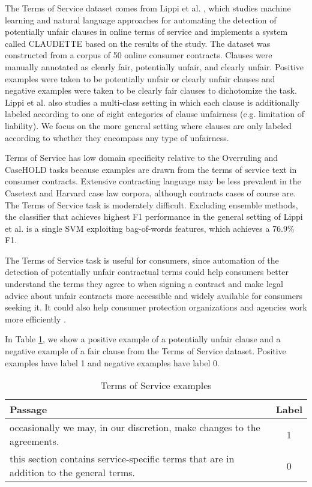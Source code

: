 \documentclass[sigconf]{acmart}
\begin{document}
The Terms of Service dataset comes from Lippi et al. \cite{Lippi_2019}, which studies machine learning and natural language approaches for automating the detection of potentially unfair clauses in online terms of service and implements a system called CLAUDETTE based on the results of the study. The dataset was constructed from a corpus of 50 online consumer contracts. Clauses were manually annotated as clearly fair, potentially unfair, and clearly unfair. Positive examples were taken to be potentially unfair or clearly unfair clauses and negative examples were taken to be clearly fair clauses to dichotomize the task. Lippi et al. \cite{Lippi_2019} also studies a multi-class setting in which each clause is additionally labeled according to one of eight categories of clause unfairness (e.g. limitation of liability). We focus on the more general setting where clauses are only labeled according to whether they encompass any type of unfairness.

Terms of Service has low domain specificity relative to the Overruling and CaseHOLD tasks because examples are drawn from the terms of service text in consumer contracts. Extensive contracting language may be less prevalent in the  Casetext and Harvard case law corpora, although contracts cases of course are. The Terms of Service task is moderately difficult. Excluding ensemble methods, the classifier that achieves highest F1 performance in the general setting of Lippi et al. \cite{Lippi_2019} is a single SVM exploiting bag-of-words features, which achieves a 76.9\% F1.

The Terms of Service task is useful for consumers, since automation of the detection of potentially unfair contractual terms could help consumers better understand the terms they agree to when signing a contract and make legal advice about unfair contracts more accessible and widely available for consumers seeking it. It could also help consumer protection organizations and agencies work more efficiently \cite{Lippi_2019}.

In Table \ref{tab:tos}, we show a positive example of a potentially unfair clause and a negative example of a fair clause from the Terms of Service dataset. Positive examples have label 1 and negative examples have label 0.

\begin{table}[htb]
    \centering
    \small
    \caption{Terms of Service examples}
    \vspace{-0.15in}
    \begin{tabularx}{\columnwidth}{Xc}
         \toprule
         Passage & Label \\
         \midrule
         occasionally we may, in our discretion, make changes to the agreements. & 1 \\
         \midrule
         this section contains service-specific terms that are in addition to the general terms. & 0 \\
         \bottomrule
    \end{tabularx}
    \label{tab:tos}
    \vspace{-0.15in}
\end{table}
\end{document}
